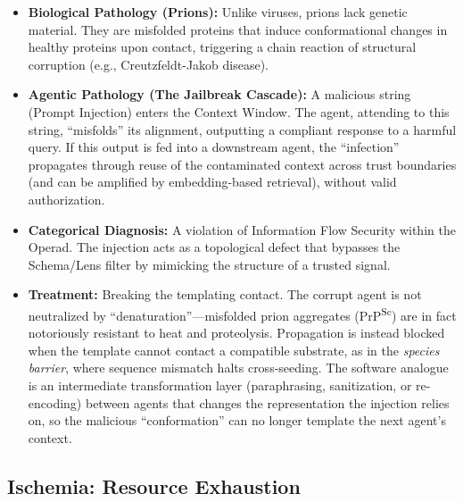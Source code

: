 \begin{itemize}[leftmargin=*]
\item \textbf{Biological Pathology (Prions):} Unlike viruses, prions lack genetic material. They are misfolded
proteins that induce conformational changes in healthy proteins upon contact, triggering a chain reaction of
structural corruption (e.g., Creutzfeldt-Jakob disease).
\item \textbf{Agentic Pathology (The Jailbreak Cascade):} A malicious string (Prompt Injection) enters the
Context Window. The agent, attending to this string, ``misfolds'' its alignment, outputting a compliant response
to a harmful query. If this output is fed into a downstream agent, the ``infection'' propagates through reuse of
the contaminated context across trust boundaries (and can be amplified by embedding-based retrieval), without
valid authorization.
\item \textbf{Categorical Diagnosis:} A violation of Information Flow Security within the Operad. The injection
acts as a topological defect that bypasses the Schema/Lens filter by mimicking the structure of a trusted signal.
\item \textbf{Treatment:} Breaking the templating contact. The corrupt agent is not neutralized by
``denaturation''---misfolded prion aggregates (PrP\textsuperscript{Sc}) are in fact notoriously resistant to
heat and proteolysis. Propagation is instead blocked when the template cannot contact a compatible substrate,
as in the \emph{species barrier}, where sequence mismatch halts cross-seeding. The software analogue is an
intermediate transformation layer (paraphrasing, sanitization, or re-encoding) between agents that changes the
representation the injection relies on, so the malicious ``conformation'' can no longer template the next
agent's context.
\end{itemize}

\subsection{Ischemia: Resource Exhaustion}

